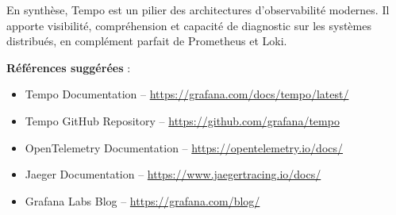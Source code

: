 En synthèse, Tempo est un pilier des architectures d’observabilité modernes. Il apporte visibilité, compréhension et capacité de diagnostic sur les systèmes distribués, en complément parfait de Prometheus et Loki.

\textbf{Références suggérées} :
\begin{itemize}
	\item Tempo Documentation – \url{https://grafana.com/docs/tempo/latest/}
	\item Tempo GitHub Repository – \url{https://github.com/grafana/tempo}
	\item OpenTelemetry Documentation – \url{https://opentelemetry.io/docs/}
	\item Jaeger Documentation – \url{https://www.jaegertracing.io/docs/}
	\item Grafana Labs Blog – \url{https://grafana.com/blog/}
\end{itemize}





